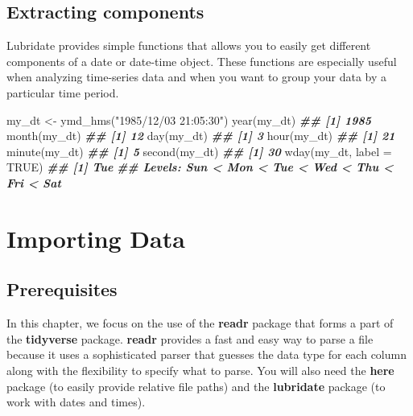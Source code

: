\documentclass[
]{book}
\newenvironment{Shaded}{\begin{snugshade}}{\end{snugshade}}
\newcommand{\AttributeTok}[1]{\textcolor[rgb]{0.77,0.63,0.00}{#1}}
\newcommand{\ConstantTok}[1]{\textcolor[rgb]{0.00,0.00,0.00}{#1}}
\newcommand{\DocumentationTok}[1]{\textcolor[rgb]{0.56,0.35,0.01}{\textbf{\textit{#1}}}}
\newcommand{\FunctionTok}[1]{\textcolor[rgb]{0.00,0.00,0.00}{#1}}
\newcommand{\NormalTok}[1]{#1}
\newcommand{\OtherTok}[1]{\textcolor[rgb]{0.56,0.35,0.01}{#1}}
\newcommand{\StringTok}[1]{\textcolor[rgb]{0.31,0.60,0.02}{#1}}
\begin{document}
\hypertarget{extracting-components}{%
\section{Extracting components}\label{extracting-components}}

Lubridate provides simple functions that allows you to easily get different components of a date or date-time object. These functions are especially useful when analyzing time-series data and when you want to group your data by a particular time period.

\begin{Shaded}
\begin{Highlighting}[]

\NormalTok{my\_dt }\OtherTok{\textless{}{-}} \FunctionTok{ymd\_hms}\NormalTok{(}\StringTok{"1985/12/03 21:05:30"}\NormalTok{)}
\FunctionTok{year}\NormalTok{(my\_dt)}
\DocumentationTok{\#\# [1] 1985}
\FunctionTok{month}\NormalTok{(my\_dt)}
\DocumentationTok{\#\# [1] 12}
\FunctionTok{day}\NormalTok{(my\_dt)}
\DocumentationTok{\#\# [1] 3}
\FunctionTok{hour}\NormalTok{(my\_dt)}
\DocumentationTok{\#\# [1] 21}
\FunctionTok{minute}\NormalTok{(my\_dt)}
\DocumentationTok{\#\# [1] 5}
\FunctionTok{second}\NormalTok{(my\_dt)}
\DocumentationTok{\#\# [1] 30}
\FunctionTok{wday}\NormalTok{(my\_dt, }\AttributeTok{label =} \ConstantTok{TRUE}\NormalTok{)}
\DocumentationTok{\#\# [1] Tue}
\DocumentationTok{\#\# Levels: Sun \textless{} Mon \textless{} Tue \textless{} Wed \textless{} Thu \textless{} Fri \textless{} Sat}
\end{Highlighting}
\end{Shaded}

\hypertarget{importing-data}{%
\chapter{Importing Data}\label{importing-data}}

\hypertarget{prerequisites-3}{%
\section{Prerequisites}\label{prerequisites-3}}

In this chapter, we focus on the use of the \textbf{readr} package that forms a part of the \textbf{tidyverse} package. \textbf{readr} provides a fast and easy way to parse a file because it uses a sophisticated parser that guesses the data type for each column along with the flexibility to specify what to parse. You will also need the \textbf{here} package (to easily provide relative file paths) and the \textbf{lubridate} package (to work with dates and times).
\end{document}
